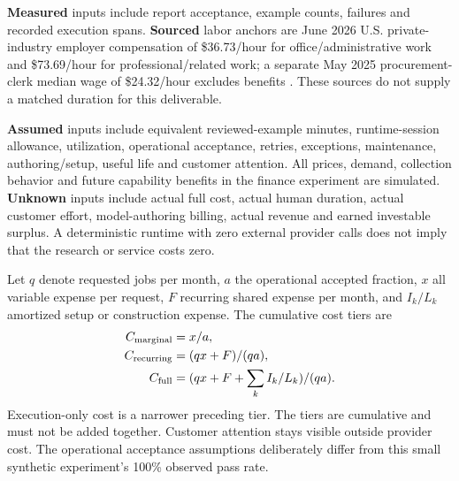 \documentclass[11pt,letterpaper]{article}
\newcommand{\usd}[1]{\$#1}
\begin{document}
\textbf{Measured} inputs include report acceptance, example counts, failures and recorded execution spans. \textbf{Sourced} labor anchors are June 2026 U.S. private-industry employer compensation of \usd{36.73}/hour for office/administrative work and \usd{73.69}/hour for professional/related work; a separate May 2025 procurement-clerk median wage of \usd{24.32}/hour excludes benefits \cite{blsecec,blsoews}. These sources do not supply a matched duration for this deliverable.

\textbf{Assumed} inputs include equivalent reviewed-example minutes, runtime-session allowance, utilization, operational acceptance, retries, exceptions, maintenance, authoring/setup, useful life and customer attention. All prices, demand, collection behavior and future capability benefits in the finance experiment are simulated. \textbf{Unknown} inputs include actual full cost, actual human duration, actual customer effort, model-authoring billing, actual revenue and earned investable surplus. A deterministic runtime with zero external provider calls does not imply that the research or service costs zero.

Let $q$ denote requested jobs per month, $a$ the operational accepted fraction, $x$ all variable expense per request, $F$ recurring shared expense per month, and $I_k/L_k$ amortized setup or construction expense. The cumulative cost tiers are
\begin{align}
 C_{\rm marginal}&=x/a,\\
 C_{\rm recurring}&=(qx+F)/(qa),\\
 C_{\rm full}&=(qx+F+\sum_k I_k/L_k)/(qa).
\end{align}
Execution-only cost is a narrower preceding tier. The tiers are cumulative and must not be added together. Customer attention stays visible outside provider cost. The operational acceptance assumptions deliberately differ from this small synthetic experiment's 100\% observed pass rate.
\end{document}
